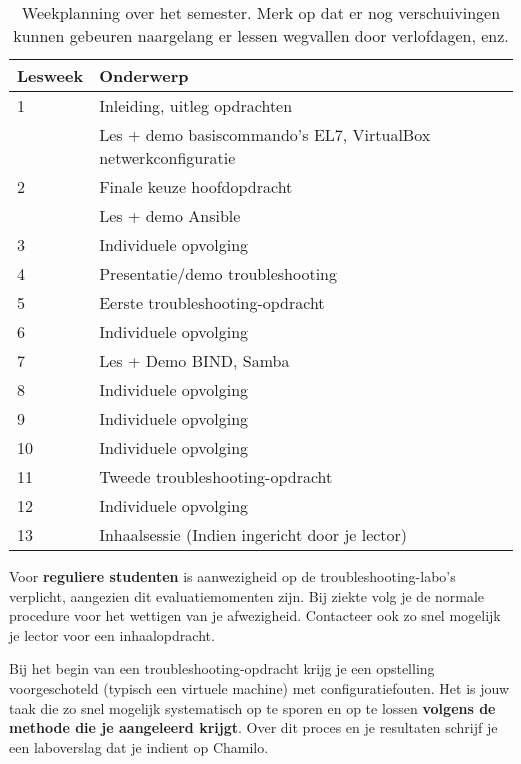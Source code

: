 \begin{table}
  \centering
  \begin{tabular}{ll}
    \toprule
    \textbf{Lesweek} & \textbf{Onderwerp}                                             \\
    \midrule
    1  & Inleiding, uitleg opdrachten                                   \\
       & Les + demo basiscommando's EL7, VirtualBox netwerkconfiguratie \\
    2  & Finale keuze hoofdopdracht                                     \\
       & Les + demo Ansible                                             \\
    3  & Individuele opvolging                                          \\
    4  & Presentatie/demo troubleshooting                               \\
    5  & Eerste troubleshooting-opdracht                                \\
    6  & Individuele opvolging                                          \\
    7  & Les + Demo BIND, Samba                                         \\
    8  & Individuele opvolging                                          \\
    9  & Individuele opvolging                                          \\
    10 & Individuele opvolging                                          \\
    11 & Tweede troubleshooting-opdracht                                \\
    12 & Individuele opvolging                                          \\
    13 & Inhaalsessie (Indien ingericht door je lector)
  \end{tabular}
  \label{tab:weekplanning}
  \caption{Weekplanning over het semester. Merk op dat er nog verschuivingen kunnen gebeuren naargelang er lessen wegvallen door verlofdagen, enz.}
\end{table}


Voor \textbf{reguliere studenten} is aanwezigheid op de troubleshooting-labo's verplicht, aangezien dit evaluatiemomenten zijn. Bij ziekte volg je de normale procedure voor het wettigen van je afwezigheid. Contacteer ook zo snel mogelijk je lector voor een inhaalopdracht.

Bij het begin van een troubleshooting-opdracht krijg je een opstelling voorgeschoteld (typisch een virtuele machine) met configuratiefouten. Het is jouw taak die zo snel mogelijk systematisch op te sporen en op te lossen \textbf{volgens de methode die je aangeleerd krijgt}. Over dit proces en je resultaten schrijf je een laboverslag dat je indient op Chamilo.

